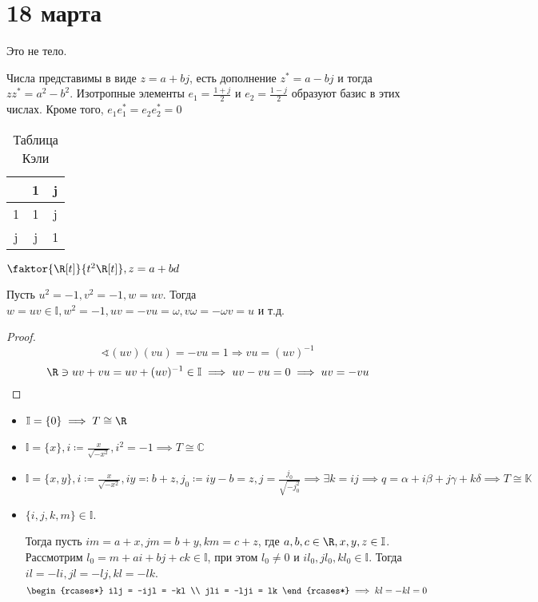 \chapter{18 марта}

\begin{example}
	Это не тело.

	Числа представимы в виде \(z = a + bj\), есть дополнение \(z^* = a - bj\) и тогда \(zz^* = a^2 - b^2\). Изотропные элементы \(e_1 = \frac{1+j}{2}\) и \(e_2 = \frac{1-j}{2}\) образуют базис в этих числах. Кроме того, \(e_1 e_1^* = e_2 e_2^* = 0\)
	\begin{table}[h]
		\caption{Таблица Кэли}
		\centering
		\begin{tabular}{C|C|C}
			  & 1 & j \\  & 1 & j \\ \hline
			j & j & 1 \\
		\end{tabular}
	\end{table}
\end{example}

\begin{example}
	\(\faktor{\R[t]}{t^2 \R[t]}, z = a + bd\)
\end{example}

\begin{lemma}
	Пусть \(u^2 = - 1, v^2 =- 1, w = uv\). Тогда \(w = uv \in \mathbb{I}, w^2 =- 1, uv = -vu = \omega, v \omega = - \omega v = u\) и т.д.
\end{lemma}
\begin{proof}
	\[\sphericalangle (uv)(vu) = - vu = 1 \Rightarrow vu = (uv)^{-1}\]
	\[\R \ni uv + vu = uv + (uv)^{-1} \in \mathbb{I} \implies uv - vu = 0 \implies uv = -vu\]
\end{proof}

\begin{theorem}\itemfix
	\begin{itemize}
		\item \(\mathbb{I} = \{0\} \implies T \cong \R\)
		\item \(\mathbb{I} = \{x\}, i \coloneqq \frac{x}{\sqrt{-x^2}}, i^2 = -1 \implies T \cong \mathbb{C}\)
		\item \(\mathbb{I} = \{x, y\}, i \coloneqq \frac{x}{\sqrt{-x^2}}, iy \eqqcolon b + z, j_0 \coloneqq iy - b = z, j = \frac{j_0}{\sqrt{-j_0^2}} \implies \exists k = ij \implies q = \alpha + i \beta + j \gamma + k \delta \implies T \cong \mathbb{K}\)
		\item \(\{i, j, k, m\} \in \mathbb{I}\).

		      Тогда пусть \(im = a + x, jm = b + y, km = c + z\), где \(a, b, c \in \R, x, y, z \in \mathbb{I}\).
		      Рассмотрим \(l_0 = m + ai + bj + ck \in \mathbb{I}\), при этом \(l_0 \neq 0\) и \(il_0, jl_0, kl_0 \in \mathbb{I}\). Тогда \(il = -li, jl = -lj, kl = -lk\).
		      \[
                  \begin{rcases*}
                      ilj = -ijl = -kl \\
                      jli = -lji = lk
                  \end{rcases*} \implies kl = -kl = 0
              \]
	\end{itemize}
\end{theorem}
